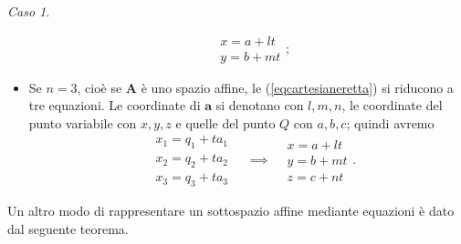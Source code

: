 \documentclass{article}
\theoremstyle{plain}
\theoremstyle{definition}
\theoremstyle{remark}
\newtheorem{case}{Caso}
\begin{document}
\begin{case}
\begin{itemize}
\[\begin{array}{rcl}
    &x =  a + lt\\
    &y =  b + mt 
\end{array};\]
\item  Se $n=3$, cioè se $\mathbf{A}$ è uno spazio affine, le (\ref{eqcartesianeretta}) si riducono a tre equazioni. 
Le coordinate di $\mathbf{a}$ si denotano con $l,m,n$, le coordinate del punto variabile con $x,y,z$ e quelle del punto $Q$ con $a,b,c$; quindi avremo 
\[\begin{array}{rcl}
    &x_1 =  q_1 + ta_1\\
    &x_2 =  q_2 + ta_2\\
    &x_3 =  q_3 + ta_3
\end{array}\quad\implies 
\begin{array}{rcl}
    &x =  a + lt\\
    &y =  b + mt\\
    &z =  c + nt
\end{array}.\]
\end{itemize}
\end{case}

\vspace{10pt}

Un altro modo di rappresentare un sottospazio affine mediante equazioni è dato dal seguente teorema.

\vspace{10pt}
\end{document}

